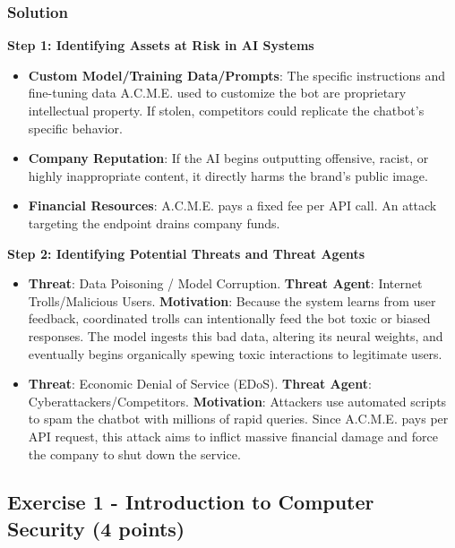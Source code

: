 \documentclass{article}
\begin{document}
\subsubsection*{Solution}
\textbf{Step 1: Identifying Assets at Risk in AI Systems}
\begin{itemize}
    \item[\textbf{1.}] \textbf{Custom Model/Training Data/Prompts}: The specific instructions and fine-tuning data A.C.M.E. used to customize the bot are proprietary intellectual property. If stolen, competitors could replicate the chatbot's specific behavior.
    \item[\textbf{2.}] \textbf{Company Reputation}: If the AI begins outputting offensive, racist, or highly inappropriate content, it directly harms the brand's public image.
    \item[\textbf{3.}] \textbf{Financial Resources}: A.C.M.E. pays a fixed fee per API call. An attack targeting the endpoint drains company funds.

\end{itemize}
\textbf{Step 2: Identifying Potential Threats and Threat Agents}
\begin{itemize}
    \item[\textbf{1.}] \textbf{Threat}: Data Poisoning / Model Corruption. \textbf{Threat Agent}: Internet Trolls/Malicious Users. \textbf{Motivation}: Because the system learns from user feedback, coordinated trolls can intentionally feed the bot toxic or biased responses. The model ingests this bad data, altering its neural weights, and eventually begins organically spewing toxic interactions to legitimate users.
    \item[\textbf{2.}] \textbf{Threat}: Economic Denial of Service (EDoS). \textbf{Threat Agent}: Cyberattackers/Competitors. \textbf{Motivation}: Attackers use automated scripts to spam the chatbot with millions of rapid queries. Since A.C.M.E. pays per API request, this attack aims to inflict massive financial damage and force the company to shut down the service.
\end{itemize}

\subsection{Exercise 1 - Introduction to Computer Security (4 points)}
\end{document}
